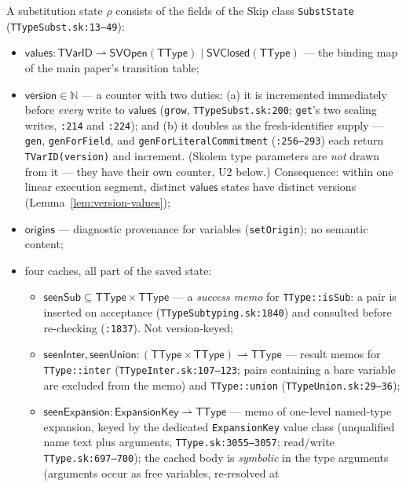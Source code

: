 \documentclass[11pt]{article}
\newcommand{\TType}{\mathsf{TType}}
\newcommand{\SVOpen}{\mathsf{SVOpen}}
\newcommand{\SVClosed}{\mathsf{SVClosed}}
\begin{document}
\begin{definition}
\label{def:fullstate}
A substitution state $\rho$ consists of the fields of the Skip class
\texttt{SubstState} (\texttt{TTypeSubst.sk:13--49}):
\begin{itemize}
\item $\mathsf{values} : \mathsf{TVarID} \rightharpoonup
  \SVOpen(\TType) \mid \SVClosed(\TType)$ — the binding map of the main
  paper's transition table;
\item $\mathsf{version} \in \mathbb{N}$ — a counter with two duties:
  (a) it is incremented immediately before \emph{every} write to
  $\mathsf{values}$ (\texttt{grow}, \texttt{TTypeSubst.sk:200};
  \texttt{get}'s two sealing writes, \texttt{:214} and \texttt{:224}); and
  (b) it doubles as the fresh-identifier supply — \texttt{gen},
  \texttt{genForField}, and \texttt{genForLiteralCommitment}
  (\texttt{:256--293}) each return \texttt{TVarID(version)} and increment.
  (Skolem type parameters are \emph{not} drawn from it — they have their
  own counter, U2 below.) Consequence: within one linear execution
  segment, distinct $\mathsf{values}$ states have distinct versions
  (Lemma~\ref{lem:version-values});
\item $\mathsf{origins}$ — diagnostic provenance for variables
  (\texttt{setOrigin}); no semantic content;
\item four caches, all part of the saved state:
  \begin{itemize}
  \item $\mathsf{seenSub} \subseteq \TType \times \TType$ — a
    \emph{success memo} for \texttt{TType::isSub}: a pair is inserted on
    acceptance (\texttt{TTypeSubtyping.sk:1840}) and consulted before
    re-checking (\texttt{:1837}). Not version-keyed;
  \item $\mathsf{seenInter}, \mathsf{seenUnion} :
    (\TType \times \TType) \rightharpoonup \TType$ — result memos for
    \texttt{TType::inter} (\texttt{TTypeInter.sk:107--123}; pairs
    containing a bare variable are excluded from the memo) and
    \texttt{TType::union} (\texttt{TTypeUnion.sk:29--36});
  \item $\mathsf{seenExpansion} : \mathsf{ExpansionKey} \rightharpoonup
    \TType$ — memo of one-level named-type expansion, keyed by the
    dedicated \texttt{ExpansionKey} value class (unqualified name text
    plus arguments, \texttt{TType.sk:3055--3057}; read/write
    \texttt{TType.sk:697--700}); the cached body is \emph{symbolic} in
    the type arguments (arguments occur as free variables, re-resolved at

\end{itemize}
\end{itemize}
\end{definition}
\end{document}
